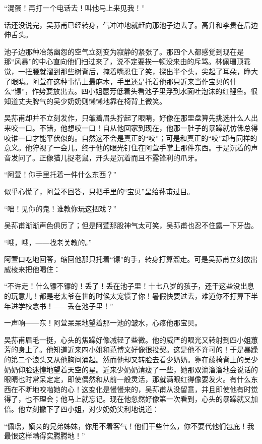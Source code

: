 \par “混蛋！再打一个电话去！叫他马上来见我！”
\par 话还没说完，吴荪甫已经转身，气冲冲地就赶向那池子边去了。高升和李贵在后边伸舌头。
\par 池子边那种冶荡幽怨的空气立刻变为寂静的紧张了。那四个人都感觉到现在是那“风暴”的中心直向他们扫过来了，说不定要挨一顿没来由的斥骂。林佩珊顶乖觉，一扭腰就溜到那些树背后，掩着嘴忍住了笑，探出半个头，尖起了耳朵，睁大了眼睛。阿萱在这种事情上最麻木，手里还是托着他那只近来当作宝贝的什么“镖”，作势要放出去。四小姐蕙芳低着头看池子里浮到水面吐泡沫的红鲤鱼。很知道丈夫脾气的吴少奶奶则懒懒地靠在椅背上微笑。
\par 吴荪甫却并不立刻发作，只皱着眉头狞起了眼睛，好像在那里盘算先挑选什么人出来咬一口。不错，他想咬一口！自从他回家到现在，他那一肚子的暴躁就仿佛总得咬谁一口才能平伏似的。自然这不会是真正的“咬”；可是和真正的“咬”却有同样的意义。他狞视了一会儿，终于他的眼光钉住在阿萱手掌上那件东西。于是沉着的声音发问了。正像猫儿捉老鼠，开头是沉着而且不露锋利的爪牙。
\par “阿萱！你手里托着一件什么东西？”
\par 似乎心慌了，阿萱不回答，只把手里的“宝贝”呈给荪甫过目。
\par “咄！见你的鬼！谁教你玩这把戏？”
\par 吴荪甫渐渐声色俱厉了；但是阿萱那股神气太可笑，吴荪甫也忍不住露一下牙齿。
\par “哦，哦，——找老关教的。”
\par 阿萱口吃地回答，缩回他那只托着“镖”的手，转身打算溜走。可是吴荪甫立刻放出威棱来把他喝住：
\par “不许走！什么镖不镖的！丢了！丢在池子里！十七八岁的孩子，还干这些没出息的玩意儿！都是老太爷在世的时候太宠惯了你！暑假快要过去，难道你不打算下半年进学校念书！——丢在池子里！”
\par 一声响——东！阿萱呆呆地望着那一池的皱水，心疼他那宝贝。
\par 吴荪甫眉毛一挺，心头的焦躁好像减轻了些微。他的威严的眼光又转射到四小姐蕙芳的身上了。他知道近来四小姐和范博文好像很投契。这是他不许可的！于是暴躁的第二个浪头又从他胸间涌起。然而他却又转脸去看少奶奶。靠在藤椅背上的吴少奶奶仰脸迷惶地望着天空的星。近来少奶奶清瘦了一些，她那双滴溜溜地会说话的眼睛也时常呆定定，即使偶然和从前一般灵活，那就满眼红得像要发火。有什么东西在不断地咬啮她的心！这变化是慢慢来的，吴荪甫从没留意，并且即使他有时觉得了，也不理会；他马上就忘记。现在他忽然好像第一次看到，心头的暴躁就又加倍。他立刻撇下了四小姐，对少奶奶尖利地说道：
\par “佩瑶，嫡亲的兄弟姊妹，你用不着客气！他们干些什么，你不要代他们包庇！我最恨这样瞒得实腾腾地！”
